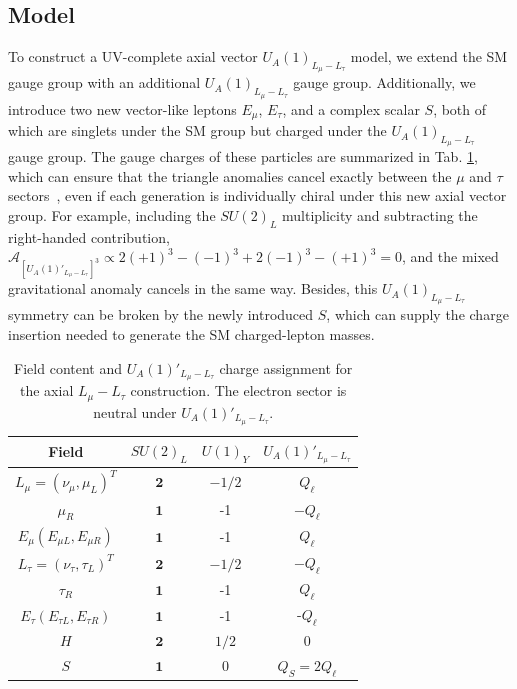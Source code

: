 \documentclass[onecolumn, aps, nofootinbib, prd, preprint, floats, floatfix, amsmath, amssymb, superscriptaddress, preprintnumbers]{revtex4-1}
\begin{document}
\subsection{Model}
To construct a UV-complete axial vector ${ U_A(1)}_{L_\mu-L_\tau}$ model, we extend the SM gauge group with an additional ${ U_A(1)}_{L_\mu-L_\tau}$ gauge group. Additionally, we introduce two new vector-like leptons $E_\mu$, $E_\tau$, and a complex scalar $S$, both of which are singlets under the SM group but charged under the ${U_A(1)}_{L_\mu-L_\tau}$ gauge group. The gauge charges of these particles are summarized in Tab. \ref{tab:charge-assignment}, which can ensure that the triangle anomalies cancel exactly between the $\mu$ and $\tau$ sectors~\cite{}, even if each generation is individually chiral under this new axial vector group. For example, including the $SU(2)_L$ multiplicity and subtracting the right-handed contribution, $\mathcal{A}_{[U_A(1)'_{L_\mu-L_\tau}]^3} \propto 2(+1)^3-(-1)^3+2(-1)^3-(+1)^3=0$, and the mixed gravitational anomaly cancels in the same way. Besides, this ${U_A(1)}_{L_\mu-L_\tau}$ symmetry can be broken by the newly introduced $S$, which can supply the charge insertion needed to generate the SM charged-lepton masses.
\begin{table}[htbp]
    \centering
    \begin{tabular}{cccc}
    \hline
    Field & $SU(2)_L$ & $U(1)_Y$ & $U_A(1)'_{L_\mu-L_\tau}$ \\
    \hline
    $L_{\mu}=\left(\nu_{\mu}, \mu_L\right)^T$ & $\mathbf{2}$ & $-1 / 2$ & $Q_{\ell}$ \\
    \hline
    $\mu_R$ & $\mathbf{1}$ & -1 & $-Q_\ell$ \\
    \hline
    $E_\mu\left(E_{\mu L}, E_{\mu R}\right)$ & $\mathbf{1}$ & -1 & $Q_\ell$\\
    \hline
    $L_{\tau}=\left(\nu_{\tau}, \tau_L\right)^T$ & $\mathbf{2}$ & $-1 / 2$ & $-Q_\ell$ \\
    \hline
    $\tau_R$ & $\mathbf{1}$ & -1 & $Q_\ell$ \\
    \hline
    $E_\tau\left(E_{\tau L}, E_{\tau R}\right)$ & $\mathbf{1}$ & -1 & -$Q_\ell$\\
    \hline
    $H$ & $\mathbf{2}$ & $1 / 2$ & 0 \\
    $S$ & $\mathbf{1}$ & 0 & $Q_S=2Q_\ell$\\
    \hline
    \end{tabular}
    \caption{Field content and $U_A(1)'_{L_\mu-L_\tau}$ charge assignment for the axial $L_\mu-L_\tau$ construction. The electron sector is neutral under $U_A(1)'_{L_\mu-L_\tau}$.}
    \label{tab:charge-assignment}
\end{table}
\end{document}

